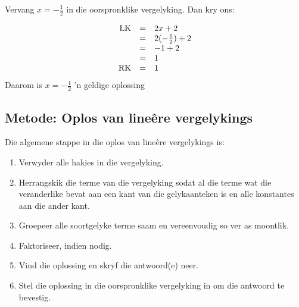 \begin{equation*}

\end{equation*}
Vervang  $x=-\frac{1}{2}$ in die oorspronklike vergelyking. Dan kry ons:

\begin{equation*}
    \begin{array}{ccl}\hfill \mbox{LK}& =& 2x+2\hfill \\
	  & =& 2(-\frac{1}{2})+2\hfill \\
	  & =& -1+2\hfill \\
	  & =& 1\hfill \\
	  \hfill \mbox{RK}& =& 1\hfill \\
    \end{array}
\end{equation*}
Daarom is $x = -\frac{1}{2}$ 'n geldige oplossing


\subsection*{Metode: Oplos van lineêre vergelykings}

Die algemene stappe in die oplos van lineêre vergelykings is:
\begin{enumerate}[noitemsep, label=\textbf{\arabic*}. ] 
    \item Verwyder alle hakies in die vergelyking.
    \item Herrangskik die terme van die vergelyking sodat al die terme wat die veranderlike bevat aan een kant van die gelykaanteken is en alle konstantes aan die ander kant.
    \item Groepeer alle soortgelyke terme saam en vereenvoudig so ver as moontlik.
\item Faktoriseer, indien nodig.
    \item Vind die oplossing en skryf die antwoord(e) neer.
    \item Stel die oplossing in die oorspronklike vergelyking in om die antwoord te bevestig.
\end{enumerate}


